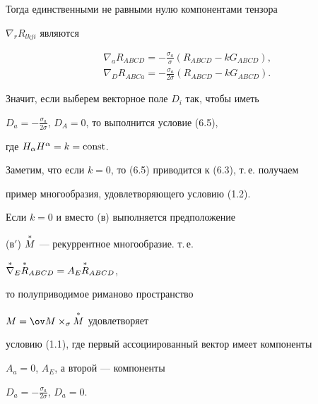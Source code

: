Тогда единственными не равными нулю компонентами тензора


$\nabla_r R_{lkji}$ являются


\begin{align*}


& \nabla_a R_{ABCD}=-\frac{\sigma_a}{\sigma}


(R_{ABCD}-kG_{ABCD}), \\


& \nabla_D R_{ABCa}=-\frac{\sigma_a}{2\sigma}


(R_{ABCD}-kG_{ABCD}).


\end{align*}





Значит, если выберем векторное поле $D_i$ так, чтобы иметь


$D_a=-\frac{\sigma_a}{2\sigma}$, $D_A=0$, то выполнится условие (6.5),


где $H_\alpha H^\alpha=k=\operatorname{const}$.





Заметим, что если $k=0$, то (6.5) приводится к (6.3), т.\,е. получаем


пример многообразия, удовлетворяющего условию (1.2).


Если $k=0$ и вместо (в) выполняется предположение





(в$'$) $\overset{*}{M}{}$ --- рекуррентное многообразие. т.\,е.


$\overset{*}{\nabla}{}_E\overset{*}{R}{}_{ABCD}=A_E\overset{*}{R}{}_{ABCD}$,





\noindent то полуприводимое риманово пространство


$M=\ov M\times_\sigma\up{*}{M}$ удовлетворяет


условию (1.1), где первый ассоциированный вектор имеет компоненты


$A_a=0$, $A_E$, а второй --- компоненты


$D_a=-\frac{\sigma_a}{2\sigma}$, $D_a=0$.








